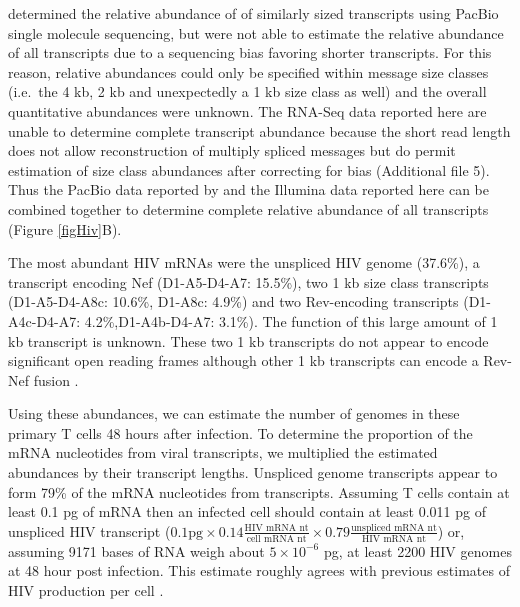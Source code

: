 \documentclass[../sherrill-Mix_thesis.tex]{subfiles}
\begin{document}
		\citet{Ocwieja2012} determined the relative abundance of \hivEight{} of similarly sized transcripts using PacBio single molecule sequencing, but were not able to estimate the relative abundance of all transcripts due to a sequencing bias favoring shorter transcripts.  For this reason, relative abundances could only be specified within message size classes (i.e.\  the 4 kb, 2 kb and unexpectedly a 1 kb size class as well) and the overall quantitative abundances were unknown.  The RNA-Seq data reported here are unable to determine complete transcript abundance because the short read length does not allow reconstruction of multiply spliced messages but do permit estimation of size class abundances after correcting for \threePrime{} bias (Additional file 5). Thus the PacBio data reported by \citet{Ocwieja2012} and the Illumina data reported here can be combined together to determine complete relative abundance of all \hivEight{} transcripts (Figure \ref{figHiv}B). 

	   The most abundant HIV mRNAs were the unspliced HIV genome (37.6\%), a transcript encoding Nef (D1-A5-D4-A7: 15.5\%), two 1 kb size class transcripts (D1-A5-D4-A8c: 10.6\%, D1-A8c: 4.9\%) and two Rev-encoding transcripts (D1-A4c-D4-A7: 4.2\%,D1-A4b-D4-A7: 3.1\%). The function of this large amount of 1 kb transcript is unknown. These two 1 kb transcripts do not appear to encode significant open reading frames although other 1 kb transcripts can encode a Rev-Nef fusion \citep{Ocwieja2012}. 

		Using these abundances, we can estimate the number of \hivEight{} genomes in these pri\-mary T cells 48 hours after infection.  To determine the proportion of the mRNA nucleotides from viral transcripts, we multiplied the estimated abundances by their tran\-script lengths. Unspliced genome tran\-scripts appear to form 79\% of the mRNA nucleotides from \hivEight{} transcripts. Assuming T cells contain at least 0.1 pg of mRNA then an infected cell should contain at least 0.011 pg of unspliced HIV transcript ($0.1 \textrm{pg} \times 0.14\frac{\textrm{HIV mRNA nt}}{\textrm{cell mRNA nt}}\times 0.79\frac{\textrm{unspliced mRNA nt}}{\textrm{HIV mRNA nt}}$) or, assuming 9171 bases of RNA weigh about $5 \times 10^{-6}$ pg, at least 2200 HIV genomes at 48 hour post infection. This estimate rough\-ly agrees with previous estimates of HIV production per cell \citep{Hockett1999,DeBoer2010,Whisnant2013}. 
\end{document}
